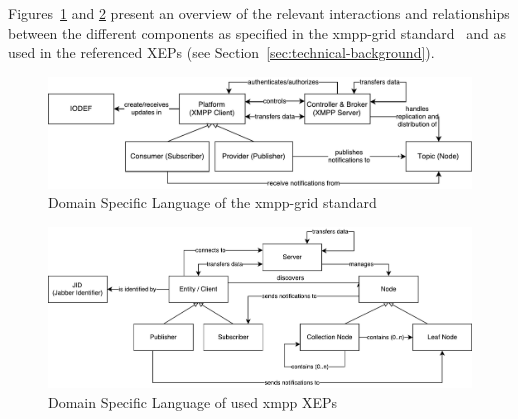 Figures~\ref{fig:architecturedslgriddraft} and \ref{fig:architecturedslxeps} present an overview of the relevant interactions and relationships between the different components as specified in the \gls{xmpp-grid} standard~\cite{ietf-mile-xmpp-grid-05} and as used in the referenced XEPs (see Section~\ref{sec:technical-background}).

\begin{figure}[h]
\centering
\includegraphics[width=\linewidth]{resources/architecture_dsl_grid_draft}
\caption[DSL of \gls{xmpp-grid} standard]{Domain Specific Language of the \gls{xmpp-grid} standard}
\label{fig:architecturedslgriddraft}
\end{figure}

\begin{figure}[h]
\centering
\includegraphics[width=\linewidth]{resources/architecture_dsl_xeps}
\caption[DSL of used \gls{xmpp} XEPs]{Domain Specific Language of used \gls{xmpp} XEPs}
\label{fig:architecturedslxeps}
\end{figure}
